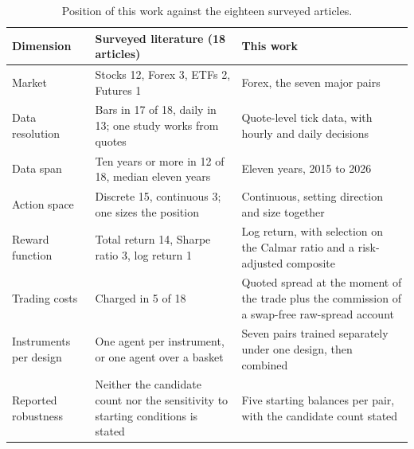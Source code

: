\begin{table}[htb!]
\centering
\footnotesize
\begin{tabularx}{\textwidth}{@{}lXX@{}}
\toprule
\textbf{Dimension} & \textbf{Surveyed literature (18 articles)} & \textbf{This work} \\
\midrule
Market & Stocks 12, Forex 3, ETFs 2, Futures 1 & Forex, the seven major pairs \\
\addlinespace
Data resolution & Bars in 17 of 18, daily in 13; one study works from quotes & Quote-level tick data, with hourly and daily decisions \\
\addlinespace
Data span & Ten years or more in 12 of 18, median eleven years & Eleven years, 2015 to 2026 \\
\addlinespace
Action space & Discrete 15, continuous 3; one sizes the position & Continuous, setting direction and size together \\
\addlinespace
Reward function & Total return 14, Sharpe ratio 3, log return 1 & Log return, with selection on the Calmar ratio and a risk-adjusted composite \\
\addlinespace
Trading costs & Charged in 5 of 18 & Quoted spread at the moment of the trade plus the commission of a swap-free raw-spread account \\
\addlinespace
Instruments per design & One agent per instrument, or one agent over a basket & Seven pairs trained separately under one design, then combined \\
\addlinespace
Reported robustness & Neither the candidate count nor the sensitivity to starting conditions is stated & Five starting balances per pair, with the candidate count stated \\
\bottomrule
\end{tabularx}
\caption{Position of this work against the eighteen surveyed articles.}
\label{Tables:Positioning}
\end{table}